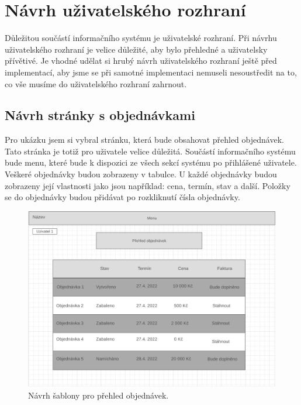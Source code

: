 \newpage

\section{Návrh uživatelského rozhraní}

Důležitou součástí informačního systému je uživatelské rozhraní. Při návrhu uživatelského rozhraní je velice důležité, aby bylo přehledné a uživatelsky přívětivé. Je vhodné udělat si hrubý návrh uživatelského rozhraní ještě před implementací, aby jsme se při samotné implementaci nemuseli nesoustředit na to, co vše musíme do uživatelského rozhraní zahrnout.

\subsection*{Návrh stránky s objednávkami}

Pro ukázku jsem si vybral stránku, která bude obsahovat přehled objednávek. Tato stránka je totiž pro uživatele velice důležitá. Součástí informačního systému bude menu, které bude k dispozici ze všech sekcí systému po přihlášené uživatele. Veškeré objednávky budou zobrazeny v tabulce. U každé objednávky budou zobrazeny její vlastnosti jako jsou například: cena, termín, stav a další. Položky se do objednávky budou přidávat po rozkliknutí čísla objednávky.

\begin{figure}[H]
    \centering
    \includegraphics[width=150mm]{obrazky-figures/mockup.png}
    
    \caption{Návrh šablony pro přehled objednávek.}
\end{figure}



